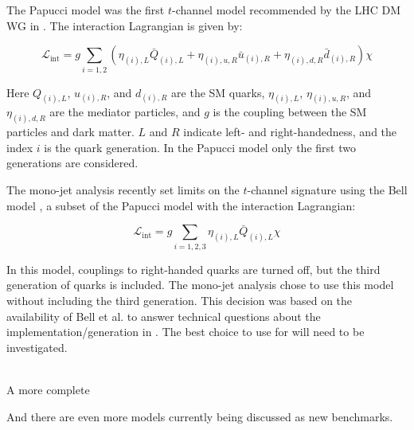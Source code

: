 The Papucci model \cite{Papucci:2014iwa} was the first $t$-channel model recommended by the LHC DM WG in \cite{Abercrombie:2015wmb}. The interaction Lagrangian is given by:

\begin{equation}
\mathcal{L}_\text{int} = g \sum_{i=1,2} \left( \eta_{(i),L} \bar{Q}_{(i),L} + \eta_{(i),u,R} \bar{u}_{(i),R} + \eta_{(i),d,R} \bar{d}_{(i),R} \right) \chi
\end{equation}

\noindent Here $Q_{(i),L}$, $u_{(i),R}$, and $d_{(i),R}$ are the SM quarks, $\eta_{(i),L}$, $\eta_{(i),u,R}$, and $\eta_{(i),d,R}$ are the mediator particles, and $g$ is the coupling between the SM particles and dark matter. $L$ and $R$ indicate left- and right-handedness, and the index $i$ is the quark generation. In the Papucci model only the first two generations are considered. 

The mono-jet analysis recently set limits on the $t$-channel signature using the Bell model \cite{Bell:2012rg}, a subset of the Papucci model with the interaction Lagrangian:

\begin{equation}
\mathcal{L}_\text{int} = g \sum_{i=1,2,3} \eta_{(i),L} \bar{Q}_{(i),L} \chi
\end{equation}

\noindent In this model, couplings to right-handed quarks are turned off, but the third generation of quarks is included. The mono-jet analysis chose to use this model without including the third generation. This decision was based on the availability of Bell et al.\xspace to answer technical questions about the implementation/generation in \madgraph. The best choice to use for \monoZ will need to be investigated.

 \\

A more complete

And there are even more models \cite{Bauer:2017fsw} currently being discussed as new benchmarks.

